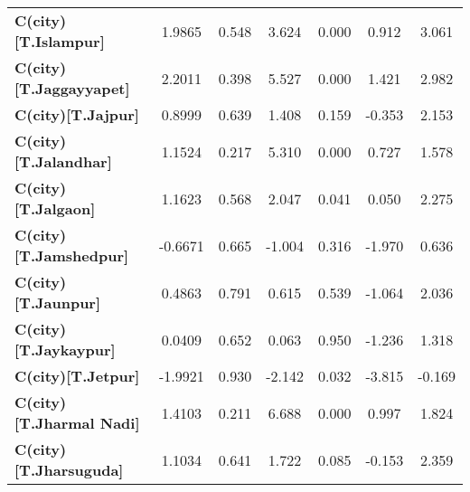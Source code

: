 \begin{center}
\begin{tabular}{lcccccc}
\textbf{C(city)[T.Islampur]}                                                                        &       1.9865  &        0.548     &     3.624  &         0.000        &        0.912    &        3.061     \\
\textbf{C(city)[T.Jaggayyapet]}                                                                     &       2.2011  &        0.398     &     5.527  &         0.000        &        1.421    &        2.982     \\
\textbf{C(city)[T.Jajpur]}                                                                          &       0.8999  &        0.639     &     1.408  &         0.159        &       -0.353    &        2.153     \\
\textbf{C(city)[T.Jalandhar]}                                                                       &       1.1524  &        0.217     &     5.310  &         0.000        &        0.727    &        1.578     \\
\textbf{C(city)[T.Jalgaon]}                                                                         &       1.1623  &        0.568     &     2.047  &         0.041        &        0.050    &        2.275     \\
\textbf{C(city)[T.Jamshedpur]}                                                                      &      -0.6671  &        0.665     &    -1.004  &         0.316        &       -1.970    &        0.636     \\
\textbf{C(city)[T.Jaunpur]}                                                                         &       0.4863  &        0.791     &     0.615  &         0.539        &       -1.064    &        2.036     \\
\textbf{C(city)[T.Jaykaypur]}                                                                       &       0.0409  &        0.652     &     0.063  &         0.950        &       -1.236    &        1.318     \\
\textbf{C(city)[T.Jetpur]}                                                                          &      -1.9921  &        0.930     &    -2.142  &         0.032        &       -3.815    &       -0.169     \\
\textbf{C(city)[T.Jharmal Nadi]}                                                                    &       1.4103  &        0.211     &     6.688  &         0.000        &        0.997    &        1.824     \\
\textbf{C(city)[T.Jharsuguda]}                                                                      &       1.1034  &        0.641     &     1.722  &         0.085        &       -0.153    &        2.359     \\

\end{tabular}
\end{center}
